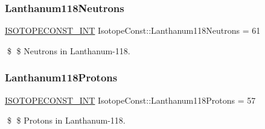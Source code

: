 \subsubsection{\texorpdfstring{Lanthanum118\+Neutrons}{Lanthanum118Neutrons}}
{\footnotesize\ttfamily \mbox{\hyperlink{group___isotope_const-_macros_ga5f18360b3e99483a35c32d789e62621c}{I\+S\+O\+T\+O\+P\+E\+C\+O\+N\+S\+T\+\_\+\+I\+NT}} Isotope\+Const\+::\+Lanthanum118\+Neutrons = 61}

\$ \$ Neutrons in Lanthanum-\/118. \mbox{\label{group___isotope_const-_lanthanum-_la118_gae1fc52ac762890840006b7dee5bf5ca4}} 
\subsubsection{\texorpdfstring{Lanthanum118\+Protons}{Lanthanum118Protons}}
{\footnotesize\ttfamily \mbox{\hyperlink{group___isotope_const-_macros_ga5f18360b3e99483a35c32d789e62621c}{I\+S\+O\+T\+O\+P\+E\+C\+O\+N\+S\+T\+\_\+\+I\+NT}} Isotope\+Const\+::\+Lanthanum118\+Protons = 57}

\$ \$ Protons in Lanthanum-\/118. 